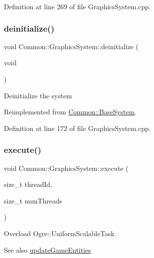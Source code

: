 Definition at line 269 of file Graphics\+System.\+cpp.

\mbox{\label{class_common_1_1_graphics_system_ade2d4efd6e535d312818a92230eb7dcf}} 
\subsubsection{\texorpdfstring{deinitialize()}{deinitialize()}}
{\footnotesize\ttfamily void Common\+::\+Graphics\+System\+::deinitialize (\begin{DoxyParamCaption}\item[{void}]{ }\end{DoxyParamCaption})\hspace{0.3cm}{\ttfamily [virtual]}}

Deinitialize the system 

Reimplemented from \hyperlink{class_common_1_1_base_system_a081f0d3daaff552efe736e6096d329e9}{Common\+::\+Base\+System}.



Definition at line 172 of file Graphics\+System.\+cpp.

\mbox{\label{class_common_1_1_graphics_system_af262817d8290de7fe06e88e424bd5588}} 
\subsubsection{\texorpdfstring{execute()}{execute()}}
{\footnotesize\ttfamily void Common\+::\+Graphics\+System\+::execute (\begin{DoxyParamCaption}\item[{size\+\_\+t}]{thread\+Id,  }\item[{size\+\_\+t}]{num\+Threads }\end{DoxyParamCaption})\hspace{0.3cm}{\ttfamily [virtual]}}

Overload Ogre\+::\+Uniform\+Scalable\+Task \begin{DoxySeeAlso}{See also}
\hyperlink{class_common_1_1_graphics_system_a9cabbf2ae25610cfa006d45a95f77d6a}{update\+Game\+Entities} 
\end{DoxySeeAlso}


